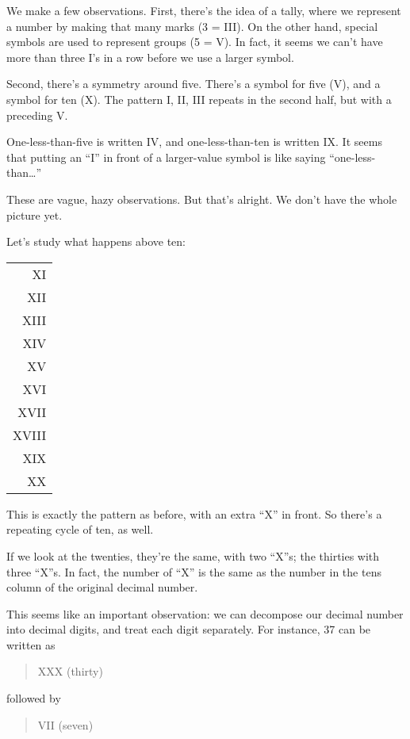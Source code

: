 \noindent We make a few observations. First, there's the idea of a
tally, where we represent a number by making that many marks (3 =
III). On the other hand, special symbols are used to represent groups
(5 = V). In fact, it seems we can't have more than three I's in a row
before we use a larger symbol.

Second, there's a symmetry around five. There's a symbol for five (V), and
a symbol for ten (X). The pattern I, II, III repeats in the second half,
but with a preceding V.

One-less-than-five is written IV, and one-less-than-ten is written IX.
It seems that putting an ``I'' in front of a larger-value symbol is like
saying ``one-less-than\dots{}''

These are vague, hazy observations. But that's alright. We don't
have the whole picture yet.

Let's study what happens above ten:

\medskip
{\sf\begin{tabular}{r}
XI \\
XII \\
XIII \\
XIV \\
XV \\
XVI \\
XVII \\
XVIII \\
XIX \\
XX \\
\end{tabular}}

\medskip
\noindent This is exactly the pattern as before, with an extra ``X''
in front. So there's a repeating cycle of ten, as well.

If we look at the twenties, they're the same, with two ``X''s; the
thirties with three ``X''s. In fact, the number of ``X'' is the same as the
number in the tens column of the original decimal number.

This seems like an important observation: we can decompose our decimal
number into decimal digits, and treat each digit separately. For instance,
37 can be written as

\begin{quote}
{\sf XXX (thirty)}
\end{quote}

\noindent followed by

\begin{quote}
{\sf VII (seven)}
\end{quote}

